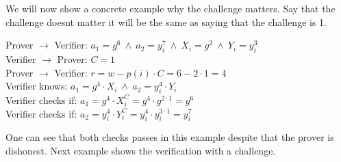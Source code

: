 \noindent
{} We will now show a concrete example why the challenge matters. Say that the challenge doesnt matter it will be the same as saying that the challenge is 1. 

\begin{infobox}
Prover \begin{math}\rightarrow\end{math} Verifier: \begin{math}a_1=g^6 \ \land\ a_2=y_i^7 \ \land \ X_i=g^2 \ \land \ Y_i=y_i^3 \end{math}\\
Verifier \begin{math}\rightarrow\end{math} Prover: \begin{math}C=1 \end{math}\\
Prover \begin{math}\rightarrow\end{math} Verifier: \begin{math}r=w-p(i)  \cdot  C = 6-2  \cdot  1= 4\end{math}\\
Verifier knows:  \begin{math}a_1=g^4  \cdot  X_i \ \land \ a_2=y_i^4  \cdot  Y_i \end{math}\\
Verifier checks if:  \begin{math}a_1 = g^4 \cdot X_i^C = g^4 \cdot g^{2 \cdot 1} = g^6\end{math}\\
Verifier checks if:  \begin{math} a_2=y_i^4  \cdot  Y_i^C = y_i^4  \cdot  y_i^{3 \cdot 1}= y_i^7 \end{math}
\end{infobox}

\noindent
One can see that both checks passes in this example despite that the prover is dishonest. Next example shows the verification with a challenge.

